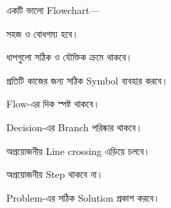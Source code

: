 

একটি ভালো Flowchart—

\begin{compacttwocolpoints}

\item সহজ ও বোধগম্য হবে।

\item ধাপগুলো সঠিক ও যৌক্তিক ক্রমে থাকবে।

\item প্রতিটি কাজের জন্য সঠিক Symbol ব্যবহার করবে।

\item Flow-এর দিক স্পষ্ট থাকবে।

\item Decision-এর Branch পরিষ্কার থাকবে।

\item অপ্রয়োজনীয় Line crossing এড়িয়ে চলবে।

\item অপ্রয়োজনীয় Step থাকবে না।

\item Problem-এর সঠিক Solution প্রকাশ করবে।

\end{compacttwocolpoints}



